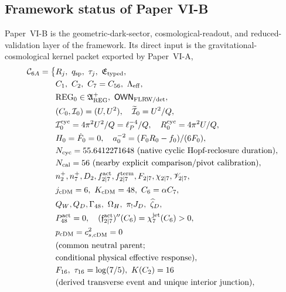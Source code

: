 \documentclass[12pt,a4paper]{article}
\begin{document}
\label{p9:part:second-framework-import}
\subsection{Framework status of Paper VI-B}
\label{p9:sec:second-framework-status}

Paper~VI-B is the geometric-dark-sector, cosmological-readout, and reduced-validation layer of the framework.  Its direct input is the gravitational-cosmological kernel packet exported by Paper~VI-A,
{\allowdisplaybreaks[3]
\begin{align}
\mathcal C_{6A}
=\bigl\{&R_j,\ q_{\rm sp},\ \tau_j,\ \mathfrak E_{\rm typed},\notag\\
&C_1,\ C_2,\ C_7=C_{56},\ \CosmoEff,\notag\\
&\mathrm{REG}_0\in\mathfrak A_{\rm REG}^{+},\
  \mathsf{OWN}_{\rm FLRW/det},\notag\\
&(C_0,\mathcal I_0)=(U,U^2),\quad \widetilde{\mathcal I}_0=U^2/Q,\notag\\
&\mathcal I_0^{\rm cyc}=4\pi^2U^2/Q=\ell_P^{-4}/Q,\quad
  R_0^{\rm cyc}=4\pi^2U/Q,\notag\\
&H_0=\dot F_0=0,\quad
  a_0^{-2}=(F_0R_0-f_0)/(6F_0),\notag\\
&N_{\rm cyc}=55.6412271648\ \text{(native cyclic Hopf-reclosure duration)},\notag\\
&N_{\rm cal}=56\ \text{(nearby explicit comparison/pivot calibration)},\notag\\
&n_2^+,n_7^+,D_2,f_{2\mid7}^{\rm act},f_{2\mid7}^{\rm term},
  F_{2\mid7},\chi_{2\mid7},\mathscr V_{2\mid7},\notag\\
&j_{\rm cDM}=6,\ K_{\rm cDM}=48,\ C_6=\alpha C_7,\notag\\
&Q_W,Q_D,\Gamma_{48},\ \Omega_H,\ \pi_!J_D,\ \widehat\zeta_D,\notag\\
&P_{48}^{\rm act}=0,\quad
  (\mathfrak f_{2\mid7}^{\rm act})''(C_6)=\chi_7^{\rm jet}(C_6)>0,\notag\\
&p_{\rm cDM}=c_{s,\rm cDM}^2=0\notag\\
&\text{(common neutral parent;}\notag\\
&\text{conditional physical effective response)},\notag\\
&F_{16},\ \tau_{16}=\log(7/5),\ K(C_2)=16\notag\\
&\text{(derived transverse event and unique interior junction)},\notag\\

\end{align}}
\end{document}
